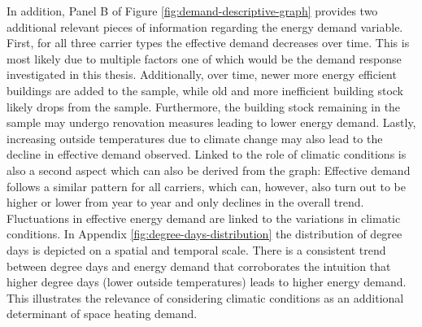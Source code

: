 \documentclass[12pt,twoside]{reedthesis}
\begin{document}
In addition, Panel B of Figure \ref{fig:demand-descriptive-graph} provides two additional relevant pieces of information regarding the energy demand variable. First, for all three carrier types the effective demand decreases over time. This is most likely due to multiple factors one of which would be the demand response investigated in this thesis. Additionally, over time, newer more energy efficient buildings are added to the sample, while old and more inefficient building stock likely drops from the sample. Furthermore, the building stock remaining in the sample may undergo renovation measures leading to lower energy demand. Lastly, increasing outside temperatures due to climate change may also lead to the decline in effective demand observed. Linked to the role of climatic conditions is also a second aspect which can also be derived from the graph: Effective demand follows a similar pattern for all carriers, which can, however, also turn out to be higher or lower from year to year and only declines in the overall trend. Fluctuations in effective energy demand are linked to the variations in climatic conditions. In Appendix \ref{fig:degree-days-distribution} the distribution of degree days is depicted on a spatial and temporal scale. There is a consistent trend between degree days and energy demand that corroborates the intuition that higher degree days (lower outside temperatures) leads to higher energy demand. This illustrates the relevance of considering climatic conditions as an additional determinant of space heating demand.
\end{document}

